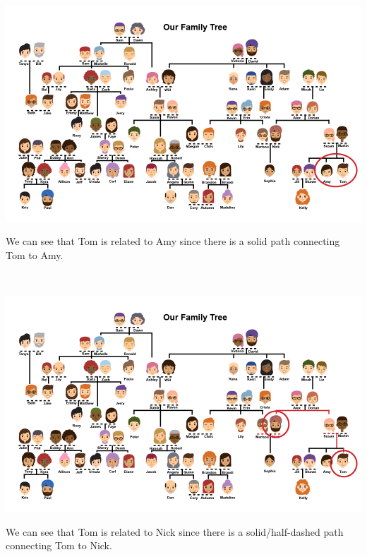 \documentclass{ximera}
\begin{document}
\begin{example}
\quad \\

\begin{image}
\includegraphics{pics/Amy_Tom.png}
\end{image}

We can see that Tom is related to Amy since there is a solid path connecting Tom to Amy.

\end{example}



\begin{example}
\quad \\

\begin{image}
\includegraphics{pics/Nick_Tom.png}
\end{image}

We can see that Tom is related to Nick since there is a solid/half-dashed path connecting Tom to Nick.

\end{example}
\end{document}
